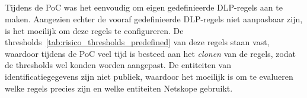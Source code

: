 
\subsection{}
\label{sec:gebruiksvriendelijkheid-resultaten}

\subsubsection{}

Tijdens de PoC was het eenvoudig om eigen gedefinieerde DLP-regels aan te maken.
Aangezien echter de vooraf gedefinieerde DLP-regels niet aanpasbaar zijn, is het moeilijk om deze regels te configureren.
De thresholds~\ref{tab:risico_thresholds_predefined} van deze regels staan vast, waardoor tijdens de PoC veel tijd is besteed aan het \textit{clonen} van de regels, zodat de thresholds wel konden worden aangepast.
De entiteiten van identificatiegegevens zijn niet publiek, waardoor het moeilijk is om te evalueren welke regels precies zijn en welke entiteiten Netskope gebruikt.


